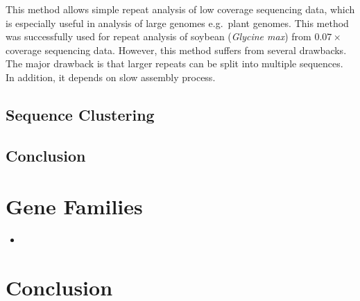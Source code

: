 This method allows simple repeat analysis of low coverage sequencing data, which is especially useful in analysis of large genomes e.g.\ plant genomes. This method was successfully used for repeat analysis of soybean (\textit{Glycine max}) from $0.07\times$ coverage sequencing data\cite{swaminathan2007global}.
However, this method suffers from several drawbacks. The major drawback is that larger repeats can be split into multiple sequences. In addition, it depends on slow assembly process.

\subsection{Sequence Clustering}

\cite{novak2010graph}\cite{pertea2003tigr}

\subsection{Conclusion}




\section{Gene Families}

\begin{itemize}
  \item \cite{hahn2005estimating}
\end{itemize}


\section{Conclusion}
